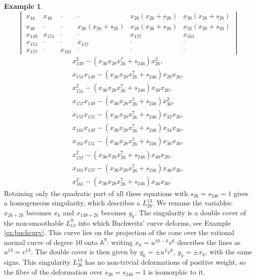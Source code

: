 \documentclass{amsart}
\newcommand{\A}{\mathbb{A}}
\def\y(#1){y_{#1}}
\def\x(#1){x_{#1}}
\def\t(#1){s_{#1}}
\theoremstyle{definition}
\newtheorem{ex}[thm]{Example}
\theoremstyle{remark}
\begin{document}
\begin{ex}
\[\begin{vmatrix}
 \x(44)&     \x(46)   &   \cdot  &     \cdot&  \x(26)( \x(26)+\t(26)) &\x(30)( \x(26)+\t(26))  \\
 \x(46)   & \cdot     & \cdot     & \x(26)( \x(26)+\t(26))  &  \x(28) ( \x(26)+\t(26))
 &\x(32)( \x(26)+\t(26))  \\
 \x(149)  & \x(151) & \cdot&   \cdot     & \x(157) & \x(161) \\
 \x(151) &   \cdot&   \cdot&  \x(157)&\cdot& \cdot\\
 \x(157)&\cdot& \x(161)&\cdot&   \cdot& \cdot
\end{vmatrix}
\]
\begin{gather*}
\x(149)^2-(\x(36) \x(28) \x(26)^7+\t(246) )\x(26)^2 , \\                                        
\x(151) \x(149)-(\x(36) \x(28) \x(26)^7+\t(246) ) \x(28) \x(26) , \\                               
\x(151)^2-(\x(36) \x(28) \x(26)^7+\t(246) )\x(30) \x(26) , \\                                    
\x(157) \x(149)-(\x(36) \x(28) \x(26)^7+\t(246) ) \x(30)^2 , \\                                   
\x(157) \x(151)-(\x(36) \x(28) \x(26)^7+\t(246) ) \x(32) \x(30) , \\                               
\x(161) \x(149)-(\x(36) \x(28) \x(26)^7+\t(246) ) \x(34) \x(30) , \\                               
\x(161) \x(151)-(\x(36) \x(28) \x(26)^7+\t(246) ) \x(36) \x(30) , \\                               
\x(157)^2-(\x(36) \x(28) \x(26)^7+\t(246) )\x(40) \x(28) , \\
\x(161) \x(157)-(\x(36) \x(28) \x(26)^7+\t(246) ) \x(46) \x(26) , \\                         
\x(161)^2-(\x(36) \x(28) \x(26)^7+\t(246) )\x(46) \x(30).  
\end{gather*} 
Retaining only the quadratic part of all these equations with $\t(26)=\t(246)=1$ 
gives a homogeneous singularity, which describes a $L_{26}^{13}$. 
We rename the variables: $\x(26+2k)$ becomes $\x(k)$ 
and $\x(149+2k)$ becomes $\y(k)$. The singularity  is a double cover of the non-smoothable
$L_{13}^9$ into which Buchweitz' curve deforms, see Example \ref{ex:buchcurv}.
This curve lies on the projection of the cone over the rational normal curve of degree $10$
onto $\A^9$: writing $\x(k)=u^{10-k}v^k$ describes the lines as $u^{13}=v^{13}$.
The double cover is then given by $\y(6)=\pm u^4v^6$, $\y(k)=\pm \x(k)$, with the same signs. 
This singularity  $L_{26}^{13}$ has no non-trivial deformations of positive weight, so 
the fibre of the deformation over $\t(26)=\t(246)=1$ is isomorphic to it.
\end{ex}
\end{document}

